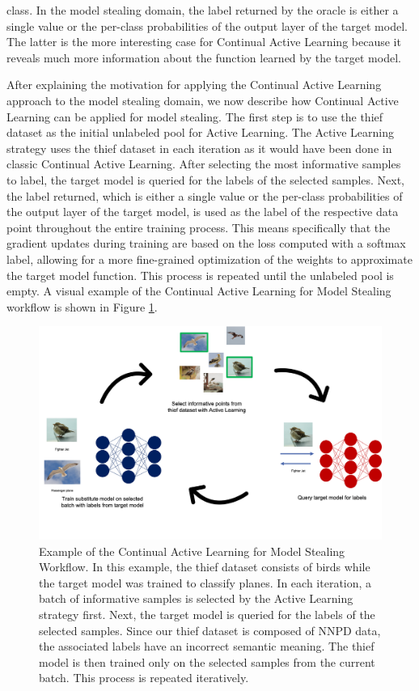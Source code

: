 class. In the model stealing domain, the label returned by the oracle is either a single value or the per-class probabilities of the output layer of the target model.
The latter is the more interesting case for Continual Active Learning because it reveals much more information about the function learned by the target model. \par
After explaining the motivation for applying the Continual Active Learning approach to the model stealing domain, we now describe how Continual Active Learning can be
applied for model stealing. The first step is to use the thief dataset as the initial unlabeled pool for Active Learning. The Active Learning
strategy uses the thief dataset in each iteration as it would have been done in classic Continual Active Learning. After selecting the most informative samples to label,
the target model is queried for the labels of the selected samples. Next, the label returned, which is either a single value or the per-class probabilities of the output
layer of the target model, is used as the label of the respective data point throughout the entire training process. This means specifically that the gradient updates during 
training are based on the loss computed with a softmax label, allowing for a more fine-grained optimization of the weights to approximate the target model function. This
process is repeated until the unlabeled pool is empty. A visual example of the Continual Active Learning for Model Stealing workflow is shown in Figure
\ref{fig:CalmsWorkflow}. \par
\begin{figure}[ht]
    \centering
    \includegraphics[width=.9\linewidth]{images/Calms_workflow.png}
    \caption[Continual Active Learning for Model Stealing Workflow]{Example of the Continual Active Learning for Model Stealing Workflow. In this example, the thief
    dataset consists of birds while the target model was trained to classify planes. In each iteration, a batch of informative samples is selected by the Active Learning
    strategy first. Next, the target model is queried for the labels of the selected samples. Since our thief dataset is composed of NNPD data, the associated labels have
    an incorrect semantic meaning. The thief model is then trained only on the selected samples from the current batch. This process is repeated iteratively.}
    \label{fig:CalmsWorkflow}
\end{figure}

